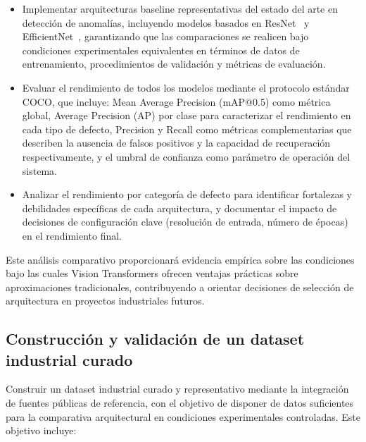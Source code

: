 \begin{itemize}
    \item Implementar arquitecturas baseline representativas del estado del arte en detección de anomalías, incluyendo modelos basados en ResNet~\cite{he2016resnet} y EfficientNet~\cite{tan2019efficientnet}, garantizando que las comparaciones se realicen bajo condiciones experimentales equivalentes en términos de datos de entrenamiento, procedimientos de validación y métricas de evaluación.
    
    \item Evaluar el rendimiento de todos los modelos mediante el protocolo estándar COCO, que incluye: Mean Average Precision (mAP@0.5) como métrica global, Average Precision (AP) por clase para caracterizar el rendimiento en cada tipo de defecto, Precision y Recall como métricas complementarias que describen la ausencia de falsos positivos y la capacidad de recuperación respectivamente, y el umbral de confianza como parámetro de operación del sistema.

    \item Analizar el rendimiento por categoría de defecto para identificar fortalezas y debilidades específicas de cada arquitectura, y documentar el impacto de decisiones de configuración clave (resolución de entrada, número de épocas) en el rendimiento final.
\end{itemize}

Este análisis comparativo proporcionará evidencia empírica sobre las condiciones bajo las cuales Vision Transformers ofrecen ventajas prácticas sobre aproximaciones tradicionales, contribuyendo a orientar decisiones de selección de arquitectura en proyectos industriales futuros.

\subsection{Construcción y validación de un dataset industrial curado}

Construir un dataset industrial curado y representativo mediante la integración de fuentes públicas de referencia, con el objetivo de disponer de datos suficientes para la comparativa arquitectural en condiciones experimentales controladas. Este objetivo incluye:

